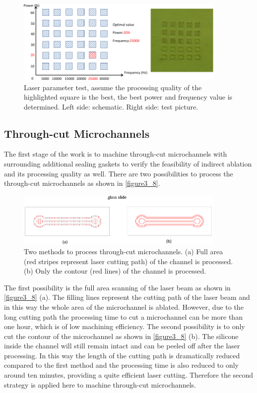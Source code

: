 \begin{figure}[h]%
\centering
\includegraphics[width=0.9\textwidth]{figures/designandfabrication/figure3_7}%
\caption{Laser parameter test, assume the processing quality of the highlighted square is the best, the best power and frequency value is determined. Left side: schematic. Right side: test picture.}%
\label{figure3_7}%
\end{figure}

\subsection{Through-cut Microchannels}
\label{3_4_1}
The first stage of the work is to machine through-cut microchannels with surrounding additional sealing gaskets to verify the feasibility of indirect ablation and its processing quality as well. There are two possibilities to process the through-cut microchannels as shown in \autoref{figure3_8}.\\

\begin{figure}[h]%
\centering
\includegraphics[width=0.9\textwidth]{figures/designandfabrication/figure3_8}%
\caption{Two methods to process through-cut microchannels. (a) Full area (red stripes represent laser cutting path) of the channel is processed. (b) Only the contour (red lines) of the channel is processed.}%
\label{figure3_8}%
\end{figure}

The first possibility is the full area scanning of the laser beam as shown in \autoref{figure3_8} (a). The filling lines represent the cutting path of the laser beam and in this way the whole area of the microchannel is ablated. However, due to the long cutting path the processing time to cut a microchannel can be more than one hour, which is of low machining efficiency. The second possibility is to only cut the contour of the microchannel as shown in \autoref{figure3_8} (b). The silicone inside the channel will still remain intact and can be peeled off after the laser processing. In this way the length of the cutting path is dramatically reduced compared to the first method and the processing time is also reduced to only around ten minutes, providing a quite efficient laser cutting. Therefore the second strategy is applied here to machine through-cut microchannels.\\

